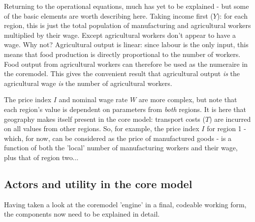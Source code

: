 Returning to the operational equations, much has yet to be explained - but some of the basic elements are worth describing here. Taking income first ($Y$): for each region, this is just the total population of manufacturing and agricultural workers multiplied by their wage. Except agricultural workers don't appear to have a wage. Why not? Agricultural output is linear: since labour is the only input, this means that food production is directly proportional to the number of workers. Food output from agricultural workers can therefore be used as the \gls{numeraire} in the \gls{coremodel}. This gives the convenient result that agricultural output \emph{is} the agricultural wage \emph{is} the number of agricultural workers.

The price index $I$ and nominal wage rate $W$ are more complex, but note that each region's value is dependent on parameters from \emph{both} regions. It is here that geography makes itself present in the core model: transport costs ($T$) are incurred on all values from other regions. So, for example, the price index $I$ for region 1 - which, for now, can be considered as the price of manufactured goods - is a function of both the 'local' number of manufacturing workers and their wage, plus that of region two...


\subsection{Actors and utility in the core model \label{sec:coremodel_util}}

Having taken a look at the \gls{coremodel} 'engine' in a final, codeable working form, the components now need to be explained in detail. 



%





